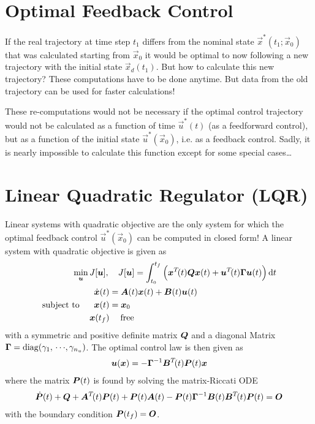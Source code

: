 	\section{Optimal Feedback Control}
		If the real trajectory at time step \( t_1 \) differs from the nominal state \( \vec{x}^\ast(t_1; \vec{x}_0) \) that was calculated starting from \( \vec{x}_0 \) it would be optimal to now following a new trajectory with the initial state \( \vec{x}_d(t_1) \). But how to calculate this new trajectory? These computations have to be done anytime. But data from the old trajectory can be used for faster calculations!

		These re-computations would not be necessary if the optimal control trajectory would not be calculated as a function of time \( \vec{u}^\ast(t) \) (as a feedforward control), but as a function of the initial state \( \vec{u}^\ast(\vec{x}_0) \), i.e. as a feedback control. Sadly, it is nearly impossible to calculate this function except for some special cases\dots

	\section{Linear Quadratic Regulator (LQR)}
		Linear systems with quadratic objective are the only system for which the optimal feedback control \( \vec{u}^\ast(\vec{x}_0) \) can be computed in closed form! A linear system with quadratic objective is given as
		\begin{align*}
			\min_{\bm{u}} &\, J[\bm{u}],\quad J[\bm{u}] = \int_{t_0}^{t_f} \Big( \bm{x}^T\!(t) \bm{Q} \bm{x}(t) + \bm{u}^T\!(t) \bm{\Gamma} \bm{u}(t) \Big) \dd{t} \\
			\mathrm{subject~to}\quad &\,
				\begin{alignedat}{2}
					\dot{\bm{x}}(t) &= \bm{A}(t) \bm{x}(t) + \bm{B}(t) \bm{u}(t) \\
					\bm{x}(t) &= \bm{x}_0 \\
					\bm{x}(t_f) &\phantom{=}\,\,\, \text{free}
				\end{alignedat}
		\end{align*}
		with a symmetric and positive definite matrix \( \bm{Q} \) and a diagonal Matrix \( \bm{\Gamma} = \operatorname{diag}(\gamma_1,\,\cdots\!,\gamma_{n_u}) \). The optimal control law is then given as
		\begin{align*}
			\bm{u}(\bm{x}) = -\bm{\Gamma}^{-1} \bm{B}^T\!(t) \bm{P}(t) \bm{x}
		\end{align*}
		where the matrix \( \bm{P}(t) \) is found by solving the matrix-Riccati ODE
		\begin{align*}
			\dot{\bm{P}}(t) + \bm{Q} + \bm{A}^T\!(t) \bm{P}(t) + \bm{P}(t) \bm{A}(t) - \bm{P}(t) \bm{\Gamma}^{-1} \bm{B}(t) \bm{B}^T\!(t) \bm{P}(t) = \bm{O}
		\end{align*}
		with the boundary condition \( \bm{P}(t_f) = \bm{O} \).

